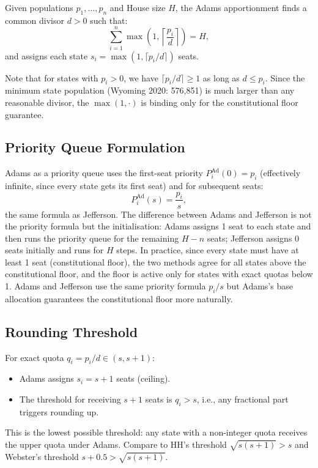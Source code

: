 \label{sec:definition}

\begin{definition}
  Given populations $p_1, \ldots, p_n$ and House size $H$,
  the Adams apportionment finds a common divisor $d > 0$ such that:
  \[
    \sum_{i=1}^{n} \max\!\left(1, \left\lceil \frac{p_i}{d} \right\rceil\right) = H,
  \]
  and assigns each state $s_i = \max(1, \lceil p_i/d \rceil)$ seats.
\end{definition}

\noindent
Note that for states with $p_i > 0$, we have $\lceil p_i/d \rceil \geq 1$
as long as $d \leq p_i$.
Since the minimum state population (Wyoming 2020: 576{,}851) is much
larger than any reasonable divisor, the $\max(1, \cdot)$ is binding only
for the constitutional floor guarantee.

\subsection{Priority Queue Formulation}

Adams as a priority queue uses the first-seat priority
$P_i^{\text{Ad}}(0) = p_i$ (effectively infinite, since every state
gets its first seat) and for subsequent seats:
\[
  P_i^{\text{Ad}}(s) = \frac{p_i}{s},
\]
the same formula as Jefferson.
The difference between Adams and Jefferson is not the priority formula
but the initialisation: Adams assigns 1 seat to each state and then
runs the priority queue for the remaining $H - n$ seats;
Jefferson assigns 0 seats initially and runs for $H$ steps.
In practice, since every state must have at least 1 seat
(constitutional floor), the two methods agree for all states above
the constitutional floor, and the floor is active only for
states with exact quotas below 1.
Adams and Jefferson use the same priority formula $p_i/s$
but Adams's base allocation guarantees the constitutional floor
more naturally.

\subsection{Rounding Threshold}

For exact quota $q_i = p_i/d \in (s, s+1)$:
\begin{itemize}
  \item Adams assigns $s_i = s+1$ seats (ceiling).
  \item The threshold for receiving $s+1$ seats is $q_i > s$,
    i.e., any fractional part triggers rounding up.
\end{itemize}
This is the lowest possible threshold: any state with a non-integer
quota receives the upper quota under Adams.
Compare to HH's threshold $\sqrt{s(s+1)} > s$ and Webster's
threshold $s + 0.5 > \sqrt{s(s+1)}$.

